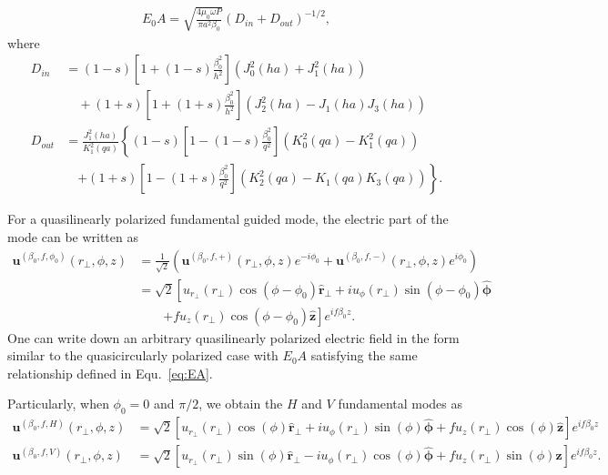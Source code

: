 \documentclass[preprint,aps,pra,onecolumn]{revtex4-1} %
\begin{document}
\begin{align}\label{eq:EA}
E_0 A=\sqrt{\frac{4\mu_0\omega P}{\pi a^2 \beta_0}}\left(D_{in} + D_{out} \right)^{-1/2},
\end{align}
where
\begin{align}
D_{in} &= (1-s)\left[ 1+(1-s)\frac{\beta_0^2}{h^2}\right] \left(J_0^2(ha) + J_1^2(ha) \right) \nonumber\\
&\quad + (1+s)\left[ 1+(1+s)\frac{\beta_0^2}{h^2}\right] \left(J_2^2(ha)- J_1(ha)J_3(ha) \right)\\
D_{out} &= \frac{J_1^2(ha)}{K_1^2(qa)}\left\{ (1-s)\left[ 1-(1-s)\frac{\beta_0^2}{q^2}\right] \left(K_0^2(qa) - K_1^2(qa) \right)\right. \nonumber\\
&\quad \left. + (1\!+\! s)\left[ 1\!-\! (1\!+\! s)\frac{\beta_0^2}{q^2}\right] \left(K_2^2(qa)\! -\! K_1(qa)K_3(qa) \right) \right\}.
\end{align}



For a quasilinearly polarized fundamental guided mode, the electric part of the mode can be written as 
\begin{align}
\mathbf{u}^{(\beta_0, f, \phi_0)}(r\!_\perp,\phi,z) &= \frac{1}{\sqrt{2}} \left(\mathbf{u}^{(\beta_0, f, +)}(r\!_\perp,\phi,z)e^{-i\phi_0} +\mathbf{u}^{(\beta_0, f, -)}(r\!_\perp,\phi,z)e^{i\phi_0} \right)\\
&= \sqrt{2}\left[u_{r\!_\perp}(r\!_\perp)\cos(\phi-\phi_0)\hat{\mathbf{r}}\!_\perp + iu_\phi(r\!_\perp)\sin(\phi-\phi_0)\hat{\boldsymbol{\phi}} \right. \nonumber \\
&\quad\quad \left. + fu_z(r\!_\perp)\cos(\phi-\phi_0)\hat{\mathbf{z}} \right]e^{if\beta_0 z}.
\end{align}
One can write down an arbitrary quasilinearly polarized electric field in the form similar to the quasicircularly polarized case with $E_0A$ satisfying the same relationship defined in Equ.~\eqref{eq:EA}. 

Particularly, when $\phi_0=0$ and $\pi/2$, we obtain the $H$ and $V$ fundamental modes as
\begin{align}
\mathbf{u}^{(\beta_0, f, H)}(r\!_\perp,\phi,z)
&= \sqrt{2}\left[u_{r\!_\perp}(r\!_\perp)\cos(\phi)\hat{\mathbf{r}}\!_\perp + iu_\phi(r\!_\perp)\sin(\phi)\hat{\boldsymbol{\phi}} + fu_z(r\!_\perp)\cos(\phi)\hat{\mathbf{z}} \right]e^{if\beta_0 z}\\
\mathbf{u}^{(\beta_0, f, V)}(r\!_\perp,\phi,z)
&= \sqrt{2}\left[u_{r\!_\perp}(r\!_\perp)\sin(\phi)\hat{\mathbf{r}}\!_\perp - iu_\phi(r\!_\perp)\cos(\phi)\hat{\boldsymbol{\phi}}  + fu_z(r\!_\perp)\sin(\phi)\hat{\mathbf{z}} \right]e^{if\beta_0 z}.
\end{align}
\end{document}
